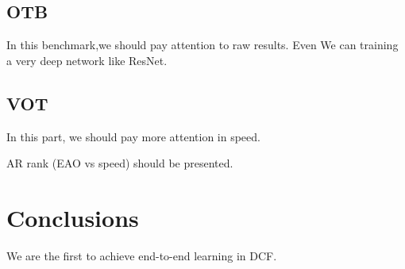 \documentclass[11pt]{article}
\begin{document}
\subsection{OTB}
In this benchmark,we should pay attention to raw results. Even We can training a very deep network like ResNet.

\subsection{VOT}
In this part, we should pay more attention in speed. 

AR rank 
(EAO  vs speed)  should be presented.


\section{Conclusions}
We are the first to achieve end-to-end learning in DCF.

\pagebreak		


\end{document}
